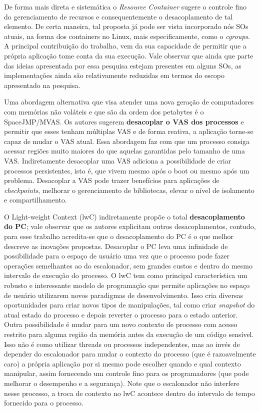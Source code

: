 De forma mais direta e sistemática o \textit{Resource Container} sugere o
controle fino do gerenciamento de recursos e consequentemente o desacoplamento
de tal elemento. De certa maneira, tal proposta já pode ser vista incorporado
nós SOs atuais, na forma dos containers no Linux, mais especificamente, como o
\textit{cgroups}. A principal contribuição do trabalho, vem da sua capacidade
de permitir que a própria aplicação tome conta da sua execução.  Vale observar
que ainda que parte das ideias apresentada por essa pesquisa estejam presentes
em alguns SOs, as implementações ainda são relativamente reduzidas em termos do
escopo apresentado na pesquisa.

Uma abordagem alternativa que visa atender uma nova geração de computadores com
memórias não voláteis e que são da ordem dos petabytes é o SpaceJMP/MVAS.  Os
autores sugerem \textbf{desacoplar o VAS dos processos} e permitir que esses
tenham múltiplas VAS e de forma reativa, a aplicação torne-se capaz de mudar o
VAS atual. Essa abordagem faz com que um processo consiga acessar regiões muito
maiores do que aquelas garantidas pelo tamanho de uma VAS. Indiretamente
desacoplar uma VAS adiciona a possibilidade de criar processos persistentes,
isto é, que vivem mesmo após o boot ou mesmo após um problema. Desacoplar a VAS
pode trazer benefícios para aplicações de \textit{checkpoints}, melhorar o
gerenciamento de bibliotecas, elevar o nível de isolamento e compartilhamento.

O Light-weight Context (lwC) indiretamente propõe o total
\textbf{desacoplamento do PC}; vale observar que os autores explicitam outros
desacoplamentos, contudo, para esse trabalho acredita-se que o desacoplamento
do PC é o que melhor descreve as inovações propostas. Desacoplar o PC leva uma
infinidade de possibilidade para o espaço de usuário uma vez que o processo
pode fazer operações semelhantes ao do escalonador, sem grandes custos e dentro
do mesmo intervalo de execução do processo. O lwC tem como principal
característica um robusto e interessante modelo de programação que permite
aplicações no espaço de usuário utilizarem novos paradigmas de desenvolvimento.
Isso cria diversas oportunidades para criar novos tipos de manipulações, tal
como criar \emph{snapshot} do atual estado do processo e depois reverter o
processo para o estado anterior. Outra possibilidade é mudar para um novo
contexto de processo com acesso restrito para alguma região da memória antes da
execução de um código sensível. Isso não é como utilizar threads ou processos
independentes, mas ao invés de depender do escalonador para mudar o contexto do
processo (que é razoavelmente caro) a própria aplicação por si mesmo pode
escolher quando e qual contexto manipular, assim fornecendo um controle fino
para os programadores (que pode melhorar o desempenho e a segurança). Note que
o escalonador não interfere nesse processo, a troca de contexto no lwC acontece
dentro do intervalo de tempo fornecido para o processo.

